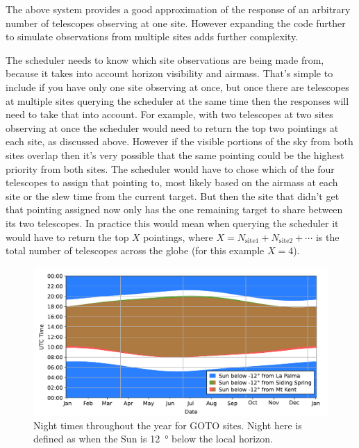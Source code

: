 \begin{colsection}
\begin{colsection}
The above system provides a good approximation of the response of an arbitrary number of telescopes observing at one site. However expanding the code further to simulate observations from multiple sites adds further complexity.

The scheduler needs to know which site observations are being made from, because it takes into account horizon visibility and airmass. That's simple to include if you have only one site observing at once, but once there are telescopes at multiple sites querying the scheduler at the same time then the responses will need to take that into account. For example, with two telescopes at two sites observing at once the scheduler would need to return the top two pointings at each site, as discussed above. However if the visible portions of the sky from both sites overlap then it's very possible that the same pointing could be the highest priority from both sites. The scheduler would have to chose which of the four telescopes to assign that pointing to, most likely based on the airmass at each site or the slew time from the current target. But then the site that didn't get that pointing assigned now only has the one remaining target to share between its two telescopes. In practice this would mean when querying the scheduler it would have to return the top $X$ pointings, where $X = N_\text{site1} + N_\text{site2} + \cdots$ is the total number of telescopes across the globe (for this example $X=4$).

\begin{figure}[t]
    \begin{center}
        \includegraphics[width=\linewidth]{images/nights.pdf}
    \end{center}

    \caption[Night times throughout the year for GOTO sites]{
        Night times throughout the year for GOTO sites. Night here is defined as when the Sun is \SI{12}{\degree} below the local horizon.
    }\label{fig:nights}
\end{figure}


\end{colsection}
\end{colsection}
